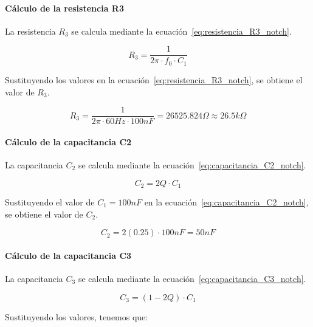         \paragraph{Cálculo de la resistencia R3}
        La resistencia $R_3$ se calcula mediante la ecuación~\ref{eq:resistencia_R3_notch}.

        \begin{equation}
            \label{eq:resistencia_R3_notch}
            R_3 = \frac{1}{2\pi \cdot f_0 \cdot C_1}
        \end{equation}

        Sustituyendo los valores en la ecuación~\ref{eq:resistencia_R3_notch}, se obtiene el valor de $R_3$.

        \begin{equation}
            R_3 = \frac{1}{2\pi \cdot 60 Hz \cdot 100 nF} = 26525.824 \Omega \approx 26.5 k\Omega
        \end{equation}

        \paragraph{Cálculo de la capacitancia C2}
        La capacitancia $C_2$ se calcula mediante la ecuación~\ref{eq:capacitancia_C2_notch}.

        \begin{equation}
            \label{eq:capacitancia_C2_notch}
            C_2 = 2Q \cdot C_1
        \end{equation}

        Sustituyendo el valor de $C_1 = 100 nF$ en la ecuación~\ref{eq:capacitancia_C2_notch}, se obtiene el valor de $C_2$.

        \begin{equation}
            C_2 = 2(0.25) \cdot 100 nF = 50 nF
        \end{equation}

        \paragraph{Cálculo de la capacitancia C3}
        La capacitancia $C_3$ se calcula mediante la ecuación~\ref{eq:capacitancia_C3_notch}.

        \begin{equation}
            \label{eq:capacitancia_C3_notch}
            C_3 = (1 - 2Q) \cdot C_1
        \end{equation}

        Sustituyendo los valores, tenemos que:

